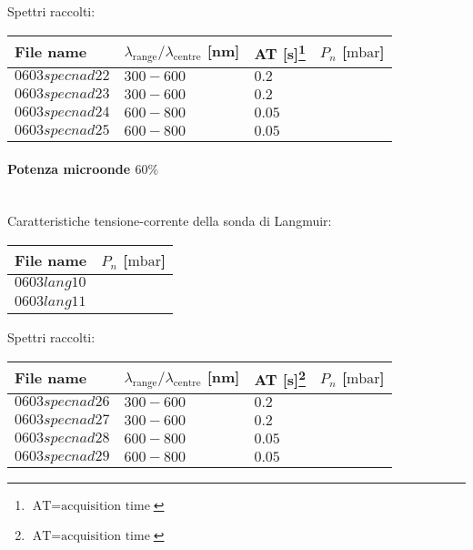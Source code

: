 Spettri raccolti:
\begin{center}
\begin{tabular}{p{3cm}p{4cm}p{2cm}p{3cm}}
\toprule
File name	&$\lambda_\text{range}\text{/}\lambda_\text{centre}$ [nm] 	&AT [s]\footnote{$\text{AT}=\text{acquisition time}$} &$P_n$ [$\si{\milli\bar}$]\\
\midrule
$0603specnad22$	&$300-600$	&$0.2$		&$  $\\
$0603specnad23$	&$300-600$	&$0.2$		&$  $\\
$0603specnad24$	&$600-800$	&$0.05$		&$  $\\
$0603specnad25$	&$600-800$	&$0.05$		&$  $\\

\bottomrule
\end{tabular}
\end{center}

\paragraph*{Potenza microonde $\text{60\%}$} ~\\
Caratteristiche tensione-corrente della sonda di Langmuir:
\begin{center}
\begin{tabular}{p{3cm}p{3cm}}
\toprule
File name	&$P_n$ [$\si{\milli\bar}$]\\
\midrule
$0603lang10$	&$  $\\
$0603lang11$	&$  $\\
\bottomrule
\end{tabular}
\end{center}

Spettri raccolti:
\begin{center}
\begin{tabular}{p{3cm}p{4cm}p{2cm}p{3cm}}
\toprule
File name	&$\lambda_\text{range}\text{/}\lambda_\text{centre}$ [nm] 	&AT [s]\footnote{$\text{AT}=\text{acquisition time}$} &$P_n$ [$\si{\milli\bar}$]\\
\midrule
$0603specnad26$	&$300-600$	&$0.2$		&$  $\\
$0603specnad27$	&$300-600$	&$0.2$		&$  $\\
$0603specnad28$	&$600-800$	&$0.05$		&$  $\\
$0603specnad29$	&$600-800$	&$0.05$		&$  $\\

\bottomrule
\end{tabular}
\end{center}


